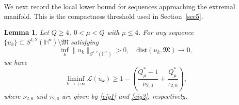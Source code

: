 \documentclass[10pt,a4paper]{amsart}
\newtheorem{lemma}{Lemma}[section]
\begin{document}
{We next record the local lower bound for sequences approaching the extremal manifold. This is the compactness threshold used in Section~\ref{sec5}.}
\begin{lemma}\label{local}
Let $Q\geq 4$, $0<\mu< Q$ with $\mu\leq 4$. For any sequence $\{u_k\}\subset S^{1,2}(\mathbb{H}^{n})\setminus \mathfrak{M}$ satisfying
\begin{equation*}
 \inf\limits_k \|u_k\|_{S^{1,2}(\mathbb{H}^{n})}>0,\quad \mathrm{dist}(u_k,\mathfrak{M})\rightarrow0,
\end{equation*}
we have
\begin{equation}\label{local1}
 \liminf\limits_{k\rightarrow+\infty}\mathcal{L}(u_k)\geq 1-\left(\frac{Q^{\ast}_{\mu}-1}{\nu_{2,0}}+\frac{Q^{\ast}_{\mu}}{\tau_{2,0}}\right),
\end{equation}
{where $\nu_{2,0}$ and $\tau_{2,0}$ are given by \eqref{eig1} and \eqref{eig2}, respectively.}
\end{lemma}
\end{document}
